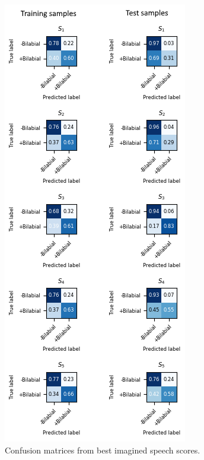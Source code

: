 \begin{figure}[h!]
\centering
\includegraphics[scale=1.2]{Figures/CM_Imagined.png}
\caption{Confusion matrices from best imagined speech scores.}
\label{Fig: CM_Imagined}
\end{figure}